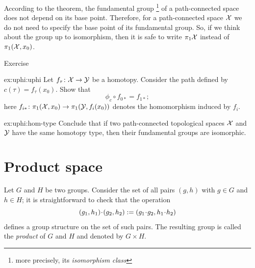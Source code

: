 According to the theorem, the fundamental group%
\footnote{more precisely, its \textit{isomorphism class}}
of a path-connected space does not depend on its base point.
Therefore, for a path-connected space $\mathcal{X}$ we do not need to specify the base point of its fundamental group.
So, if we think about the group up to isomorphism, then it is safe to write $\pi_1\mathcal{X}$ instead of $\pi_1(\mathcal{X},x_0)$.

\begin{thm}{Exercise}\label{ex:uphi}

\begin{subthm}{ex:uphi:uphi}
 Let $f_\tau\colon\mathcal{X}\to\mathcal{Y}$ be a homotopy.
Consider the path defined by $c(\tau)=f_\tau(x_0)$.
Show that
\[\phi_c\circ f_{0*}=f_{1*};\]
here $f_{i*}\colon\pi_1(\mathcal{X},x_0)\to\pi_1(\mathcal{Y},f_i(x_0))$ denotes the homomorphism induced by $f_{i}$.
\end{subthm}

\begin{subthm}{ex:uphi:hom-type}
Conclude that if two path-connected topological spaces $\mathcal{X}$ and $\mathcal{Y}$ have the same homotopy type, then
 their fundamental groups are isomorphic.
\end{subthm}

\end{thm}


\section{Product space}

Let $G$ and $H$ be two groups.
Consider the set of all pairs $(g,h)$ with $g\in G$ and $h\in H$;
it is straightforward to check that the operation
\[(g_1,h_1)\cdot (g_2,h_2)\df(g_1\cdot g_2,h_1\cdot h_2)\]
defines a group structure on the set of such pairs.
The resulting group is called the \emph{product} of $G$ and $H$ and denoted by $G\times H$.

